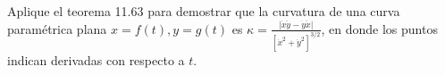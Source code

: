 \item Aplique el teorema 11.63 para demostrar que la curvatura de una curva paramétrica plana $x = f(t), y = g(t)$ es $\kappa = \frac{|\dot{x}\ddot{y} - \dot{y}\ddot{x}|}{[\dot{x}^2 + \dot{y}^2]^{3/2}}$, en donde los puntos indican derivadas con respecto a $t$.
